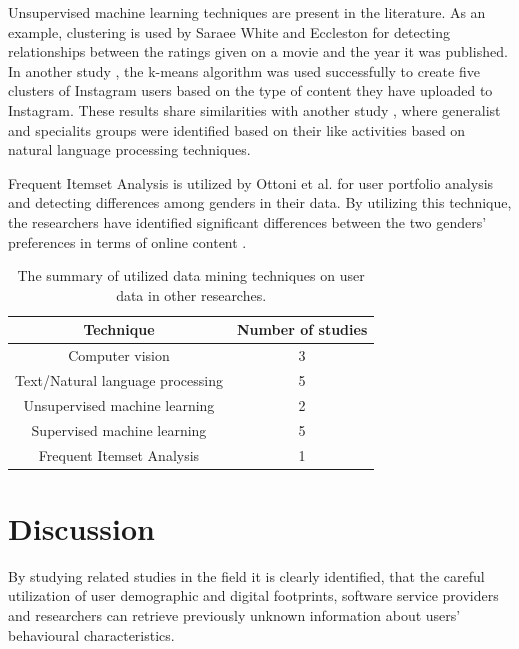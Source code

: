 \documentclass[conference]{IEEEtran}
\begin{document}
  Unsupervised machine learning techniques are present in the literature. As an example, clustering is used by Saraee White and Eccleston \cite{saraee2004data} for detecting relationships between the ratings given on a movie and the year it was published. In another study \cite{hu2014we}, the k-means algorithm was used successfully to create five clusters of Instagram users based on the type of content they have uploaded to Instagram. These results share similarities with another study \cite{jang2015no}, where generalist and specialits groups were identified based on their like activities based on natural language processing techniques. 

  Frequent Itemset Analysis is utilized by Ottoni et al. \cite{ottoni2013ladies} for user portfolio analysis and detecting differences among genders in their data. By utilizing this technique, the researchers have identified significant differences between the two genders' preferences in terms of online content \cite{ottoni2013ladies}. 

  \begin{table}[!t]
    \renewcommand{\arraystretch}{1.5}
    \caption{The summary of utilized data mining techniques on user data in other researches.}
    \label{table_of_techniques}
    \centering
      \begin{tabular}{c||c}
        Technique & Number of studies \\ 
        \hline
        Computer vision & 3  \\
        Text/Natural language processing & 5 \\
        Unsupervised machine learning & 2 \\
        Supervised machine learning & 5 \\
        Frequent Itemset Analysis & 1
      \end{tabular}
  \end{table}

\section{Discussion}
By studying related studies in the field it is clearly identified, that the careful utilization of user demographic and digital footprints, software service providers and researchers can retrieve previously unknown information about users' behavioural characteristics. 
\end{document}
